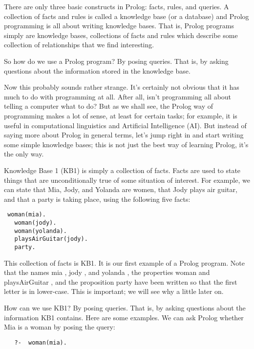 \secdown 

There are only three basic constructs in Prolog: facts, rules, and queries. A
collection of facts and rules is called a knowledge base (or a database) and
Prolog programming is all about writing knowledge bases. That is, Prolog
programs simply are knowledge bases, collections of facts and rules which
describe some collection of relationships that we find interesting.

So how do we use a Prolog program? By posing queries. That is, by asking
questions about the information stored in the knowledge base.

Now this probably sounds rather strange. It’s certainly not obvious that it has
much to do with programming at all. After all, isn’t programming all about
telling a computer what to do? But as we shall see, the Prolog way of
programming makes a lot of sense, at least for certain tasks; for example, it is
useful in computational linguistics and Artificial Intelligence (AI). But
instead of saying more about Prolog in general terms, let’s jump right in and
start writing some simple knowledge bases; this is not just the best way of
learning Prolog, it’s the only way.


Knowledge Base 1 (KB1) is simply a collection of facts. Facts are used to state
 things that are unconditionally true of some situation of interest. For
 example, we can state that Mia, Jody, and Yolanda are women, that Jody plays
 air guitar, and that a party is taking place, using the following five facts:

\begin{verbatim} 
 woman(mia). 
   woman(jody). 
   woman(yolanda). 
   playsAirGuitar(jody). 
   party.
\end{verbatim}
   
This collection of facts is KB1. It is our first example of a Prolog program.
Note that the names mia , jody , and yolanda , the properties woman and
playsAirGuitar , and the proposition party have been written so that the first
letter is in lower-case. This is important; we will see why a little later on.

How can we use KB1? By posing queries. That is, by asking questions about the
information KB1 contains. Here are some examples. We can ask Prolog whether Mia
is a woman by posing the query:

\begin{verbatim} 
   ?-  woman(mia).
\end{verbatim}

